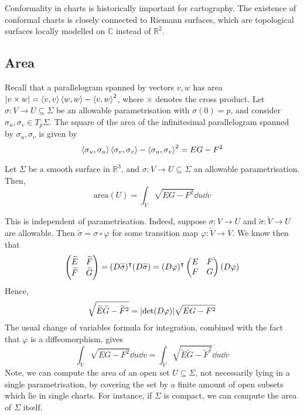 \begin{remark}
	Conformality in charts is historically important for cartography.
	The existence of conformal charts is closely connected to Riemann surfaces, which are topological surfaces locally modelled on \( \mathbb C \) instead of \( \mathbb R^2 \).
\end{remark}

\subsection{Area}
Recall that a parallelogram spanned by vectors \( v, w \) has area \( \abs{v \times w} = \left\langle{v,v}\right\rangle\left\langle{w,w}\right\rangle - \left\langle{v,w}\right\rangle^2 \), where \( \times \) denotes the cross product.
Let \( \sigma \colon V \to U \subseteq \Sigma \) be an allowable parametrisation with \( \sigma(0) = p \), and consider \( \sigma_u, \sigma_v \in T_p \Sigma \).
The square of the area of the infinitesimal parallelogram spanned by \( \sigma_u, \sigma_v \) is given by
\[
	\left\langle{\sigma_u, \sigma_u}\right\rangle\left\langle{\sigma_v, \sigma_v}\right\rangle - \left\langle{\sigma_u, \sigma_v}\right\rangle^2 = EG - F^2
\]
\begin{definition}
	Let \( \Sigma \) be a smooth surface in \( \mathbb R^3 \), and \( \sigma \colon V \to U \subseteq \Sigma \) an allowable parametrisation.
	Then,
	\[
		\mathrm{area}(U) = \int_V \sqrt{EG - F^2} \dd{u}\dd{v}
	\]
\end{definition}
\begin{remark}
	This is independent of parametrisation.
	Indeed, suppose \( \sigma \colon V \to U \) and \( \widetilde \sigma \colon \widetilde V \to U \) are allowable.
	Then \( \widetilde \sigma = \sigma \circ \varphi \) for some transition map \( \varphi \colon \widetilde V \to V \).
	We know then that
	\[
		\begin{pmatrix}
			\widetilde E & \widetilde F \\
			\widetilde F & \widetilde G
		\end{pmatrix} = (D\widetilde \sigma)^\intercal (D\widetilde \sigma) = (D\varphi)^\intercal \begin{pmatrix}
			E & F \\
			F & G
		\end{pmatrix} (D\varphi)
	\]
	Hence,
	\[
		\sqrt{\widetilde E \widetilde G - \widetilde F^2} = \abs{\det(D\varphi)} \sqrt{EG - F^2}
	\]
	The usual change of variables formula for integration, combined with the fact that \( \varphi \) is a diffeomorphism, gives
	\[
		\int_V \sqrt{EG - F^2} \dd{u}\dd{v} = \int_{\widetilde V} \sqrt{\widetilde E \widetilde G - \widetilde F^2} \dd{u}\dd{v}
	\]
	Note, we can compute the area of an open set \( U \subseteq \Sigma \), not necessarily lying in a single parametrisation, by covering the set by a finite amount of open subsets which lie in single charts.
	For instance, if \( \Sigma \) is compact, we can compute the area of \( \Sigma \) itself.
\end{remark}
